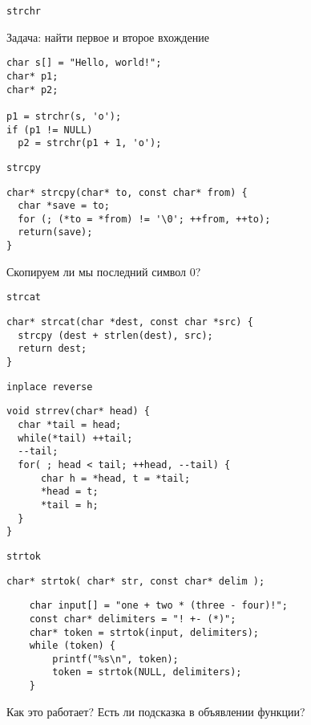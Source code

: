 \documentclass[pdf, 10pt, unicode]{beamer}
\begin{document}
\begin{frame}[fragile]{{\tt strchr}}

Задача: найти первое и второе вхождение

\begin{lstlisting}
char s[] = "Hello, world!";
char* p1;
char* p2;

p1 = strchr(s, 'o');
if (p1 != NULL)
  p2 = strchr(p1 + 1, 'o');

\end{lstlisting}

\end{frame}


\begin{frame}[fragile]{{\tt strcpy}}

\begin{lstlisting}
char* strcpy(char* to, const char* from) {
  char *save = to;
  for (; (*to = *from) != '\0'; ++from, ++to);
  return(save);
}
\end{lstlisting}
Скопируем ли мы последний символ 0?

\end{frame}

\begin{frame}[fragile]{{\tt strcat}}

\begin{lstlisting}
char* strcat(char *dest, const char *src) {
  strcpy (dest + strlen(dest), src);
  return dest;
}
\end{lstlisting}

\end{frame}


\begin{frame}[fragile]{{\tt inplace reverse}}

\begin{lstlisting}
void strrev(char* head) {
  char *tail = head;
  while(*tail) ++tail;
  --tail;
  for( ; head < tail; ++head, --tail) {
      char h = *head, t = *tail;
      *head = t;
      *tail = h;
  }
}
\end{lstlisting}

\end{frame}


\begin{frame}[fragile]{{\tt strtok}}

\begin{lstlisting}
char* strtok( char* str, const char* delim );
\end{lstlisting}

\begin{lstlisting}
    char input[] = "one + two * (three - four)!";
    const char* delimiters = "! +- (*)";
    char* token = strtok(input, delimiters);
    while (token) {
        printf("%s\n", token);
        token = strtok(NULL, delimiters);
    }
\end{lstlisting}
Как это работает? Есть ли подсказка в объявлении функции?

\end{frame}
\end{document}
